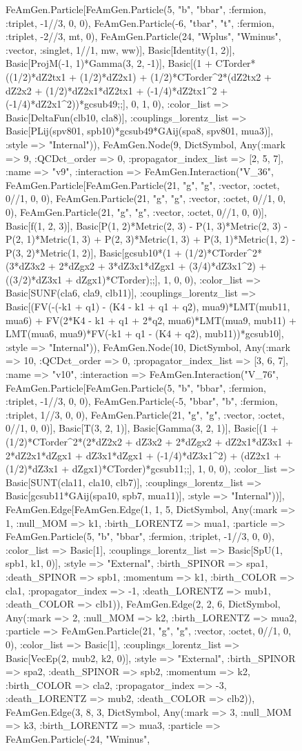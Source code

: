\documentclass{revtex4}
\begin{document}
\begin{figure}[!htb]
\begin{center}
{FeAmGen.Particle[FeAmGen.Particle(5, "b", "bbar", :fermion, :triplet, -1//3, 0, 0), FeAmGen.Particle(-6, "tbar", "t", :fermion, :triplet, -2//3, mt, 0), FeAmGen.Particle(24, "Wplus", "Wminus", :vector, :singlet, 1//1, mw, ww)], Basic[Identity(1, 2)], Basic[ProjM(-1, 1)*Gamma(3, 2, -1)], Basic[(1 + CTorder*((1/2)*dZ2tx1 + (1/2)*dZ2x1) + (1/2)*CTorder^2*(dZ2tx2 + dZ2x2 + (1/2)*dZ2x1*dZ2tx1 + (-1/4)*dZ2tx1^2 + (-1/4)*dZ2x1^2))*gcsub49;;], 0, 1, 0), :color_list => Basic[DeltaFun(clb10, cla8)], :couplings_lorentz_list => Basic[PLij(spv801, spb10)*gcsub49*GAij(spa8, spv801, mua3)], :style => "Internal")), FeAmGen.Node(9, Dict{Symbol, Any}(:mark => 9, :QCDct_order => 0, :propagator_index_list => [2, 5, 7], :name => "v9", :interaction => FeAmGen.Interaction("V_36", FeAmGen.Particle[FeAmGen.Particle(21, "g", "g", :vector, :octet, 0//1, 0, 0), FeAmGen.Particle(21, "g", "g", :vector, :octet, 0//1, 0, 0), FeAmGen.Particle(21, "g", "g", :vector, :octet, 0//1, 0, 0)], Basic[f(1, 2, 3)], Basic[P(1, 2)*Metric(2, 3) - P(1, 3)*Metric(2, 3) - P(2, 1)*Metric(1, 3) + P(2, 3)*Metric(1, 3) + P(3, 1)*Metric(1, 2) - P(3, 2)*Metric(1, 2)], Basic[gcsub10*(1 + (1/2)*CTorder^2*(3*dZ3x2 + 2*dZgx2 + 3*dZ3x1*dZgx1 + (3/4)*dZ3x1^2) + ((3/2)*dZ3x1 + dZgx1)*CTorder);;], 1, 0, 0), :color_list => Basic[SUNF(cla6, cla9, clb11)], :couplings_lorentz_list => Basic[(FV(-(-k1 + q1) - (K4 - k1 + q1 + q2), mua9)*LMT(mub11, mua6) + FV(2*K4 - k1 + q1 + 2*q2, mua6)*LMT(mua9, mub11) + LMT(mua6, mua9)*FV(-k1 + q1 - (K4 + q2), mub11))*gcsub10], :style => "Internal")), FeAmGen.Node(10, Dict{Symbol, Any}(:mark => 10, :QCDct_order => 0, :propagator_index_list => [3, 6, 7], :name => "v10", :interaction => FeAmGen.Interaction("V_76", FeAmGen.Particle[FeAmGen.Particle(5, "b", "bbar", :fermion, :triplet, -1//3, 0, 0), FeAmGen.Particle(-5, "bbar", "b", :fermion, :triplet, 1//3, 0, 0), FeAmGen.Particle(21, "g", "g", :vector, :octet, 0//1, 0, 0)], Basic[T(3, 2, 1)], Basic[Gamma(3, 2, 1)], Basic[(1 + (1/2)*CTorder^2*(2*dZ2x2 + dZ3x2 + 2*dZgx2 + dZ2x1*dZ3x1 + 2*dZ2x1*dZgx1 + dZ3x1*dZgx1 + (-1/4)*dZ3x1^2) + (dZ2x1 + (1/2)*dZ3x1 + dZgx1)*CTorder)*gcsub11;;], 1, 0, 0), :color_list => Basic[SUNT(cla11, cla10, clb7)], :couplings_lorentz_list => Basic[gcsub11*GAij(spa10, spb7, mua11)], :style => "Internal"))], FeAmGen.Edge[FeAmGen.Edge(1, 1, 5, Dict{Symbol, Any}(:mark => 1, :null_MOM => k1, :birth_LORENTZ => mua1, :particle => FeAmGen.Particle(5, "b", "bbar", :fermion, :triplet, -1//3, 0, 0), :color_list => Basic[1], :couplings_lorentz_list => Basic[SpU(1, spb1, k1, 0)], :style => "External", :birth_SPINOR => spa1, :death_SPINOR => spb1, :momentum => k1, :birth_COLOR => cla1, :propagator_index => -1, :death_LORENTZ => mub1, :death_COLOR => clb1)), FeAmGen.Edge(2, 2, 6, Dict{Symbol, Any}(:mark => 2, :null_MOM => k2, :birth_LORENTZ => mua2, :particle => FeAmGen.Particle(21, "g", "g", :vector, :octet, 0//1, 0, 0), :color_list => Basic[1], :couplings_lorentz_list => Basic[VecEp(2, mub2, k2, 0)], :style => "External", :birth_SPINOR => spa2, :death_SPINOR => spb2, :momentum => k2, :birth_COLOR => cla2, :propagator_index => -3, :death_LORENTZ => mub2, :death_COLOR => clb2)), FeAmGen.Edge(3, 8, 3, Dict{Symbol, Any}(:mark => 3, :null_MOM => k3, :birth_LORENTZ => mua3, :particle => FeAmGen.Particle(-24, "Wminus", }
\end{center}
\end{figure}
\end{document}
